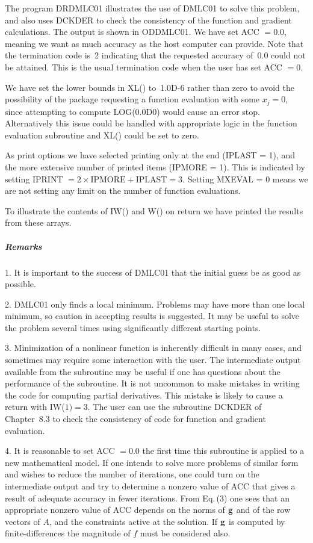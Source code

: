 \documentclass[twoside]{MATH77}
\begin{document}
The program DRDMLC01 illustrates the use of DMLC01 to solve this problem,
and also uses DCKDER to check the consistency of the function and gradient
calculations. The output is shown in ODDMLC01. We have set ACC $= 0.0$,
meaning we want as much accuracy as the host computer can provide. Note that
the termination code is~2 indicating that the requested accuracy of~0.0
could not be attained. This is the usual termination code when the user has
set ACC $= 0.$

We have set the lower bounds in XL() to~1.0D-6 rather than zero to avoid the
possibility of the package requesting a function evaluation with some $x_j =
0$, since attempting to compute LOG(0.0D0) would cause an error stop.
Alternatively this issue could be handled with appropriate logic in the
function evaluation subroutine and XL() could be set to zero.

As print options we have selected printing only at the end (IPLAST = 1), and
the more extensive number of printed items (IPMORE = 1). This is indicated
by setting IPRINT $= 2 \times \text{IPMORE} + \text{IPLAST} = 3.$ Setting
MXEVAL = 0 means we are not setting any limit on the number of function
evaluations.

To illustrate the contents of IW() and W() on return we have printed the
results from these arrays.

\subparagraph{Remarks}

1. It is important to the success of DMLC01 that the initial guess be as
good as possible.

2. DMLC01 only finds a local minimum. Problems may have more than one local
minimum, so caution in accepting results is suggested. It may be useful to
solve the problem several times using significantly different starting
points.

3. Minimization of a nonlinear function is inherently difficult in many
cases, and sometimes may require some interaction with the user. The
intermediate output available from the subroutine may be useful if one has
questions about the performance of the subroutine. It is not uncommon to
make mistakes in writing the code for computing partial derivatives. This
mistake is likely to cause a return with IW($1) = 3$. The user can use the
subroutine DCKDER of Chapter~8.3 to check the consistency of code for
function and gradient evaluation.

4. It is reasonable to set ACC $=0.0$ the first time this subroutine is
applied to a new mathematical model. If one intends to solve more problems
of similar form and wishes to reduce the number of iterations, one could
turn on the intermediate output and try to determine a nonzero value of ACC
that gives a result of adequate accuracy in fewer iterations. From Eq.\,(3)
one sees that an appropriate nonzero value of ACC depends on the norms
of ${\bf g}$ and of the row vectors of $A$, and the constraints active at
the solution. If ${\bf g}$ is computed by finite-differences the magnitude
of $f$ must be considered also.
\end{document}
